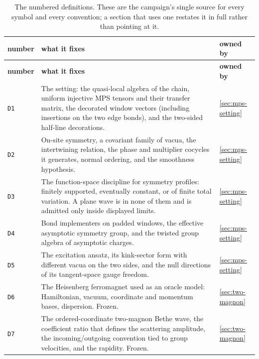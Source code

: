 {\footnotesize
\begin{longtable}{@{}p{}p{}p{}@{}}
\caption{The numbered definitions. These are the campaign's single source for
every symbol and every convention; a section that uses one restates it in
full rather than pointing at it.}
\label{tab:dict-defs}\\
\toprule
\textbf{number} & \textbf{what it fixes} & \textbf{owned by}\\
\midrule
\endfirsthead
\toprule
\textbf{number} & \textbf{what it fixes} & \textbf{owned by}\\
\midrule
\endhead
\bottomrule
\endfoot

\texttt{D1} & The setting: the quasi-local algebra of the chain, uniform
injective MPS tensors and their transfer matrix, the decorated window vectors
(including insertions on the two edge bonds), and the two-sided half-line
decorations. & \cref{sec:mps-setting}\\

\texttt{D2} & On-site symmetry, a covariant family of vacua, the intertwining
relation, the phase and multiplier cocycles it generates, normal ordering, and
the smoothness hypothesis. & \cref{sec:mps-setting}\\

\texttt{D3} & The function-space discipline for symmetry profiles: finitely
supported, eventually constant, or of finite total variation. A plane wave is
in none of them and is admitted only inside displayed limits. & \cref{sec:mps-setting}\\

\texttt{D4} & Bond implementers on padded windows, the effective asymptotic
symmetry group, and the twisted group algebra of asymptotic charges. & \cref{sec:mps-setting}\\

\texttt{D5} & The excitation ansatz, its kink-sector form with different vacua
on the two sides, and the null directions of its tangent-space gauge freedom. & \cref{sec:mps-setting}\\

\texttt{D6} & The Heisenberg ferromagnet used as an oracle model: Hamiltonian,
vacuum, coordinate and momentum bases, dispersion. Frozen. & \cref{sec:two-magnon}\\

\texttt{D7} & The ordered-coordinate two-magnon Bethe wave, the coefficient
ratio that defines the scattering amplitude, the incoming/outgoing convention
tied to group velocities, and the rapidity. Frozen. & \cref{sec:two-magnon}\\


\end{longtable}}
